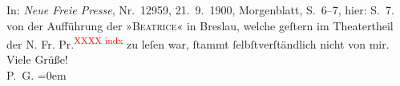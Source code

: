 \begin{ledgroupsized}[t]{13cm}
{{{                     In: \emph{Neue Freie Presse}, Nr. 12959, 21. 9. 1900, Morgenblatt, S. 6–7, hier:
                  S. 7.}}}\label{K_L02933-2h} von der Aufführung der »\textsc{Beatrice}« in Breslau, welche geſtern im Theatertheil der N. Fr.
                  Pr.\textcolor{red}{\textsuperscript{XXXX indx}} zu leſen war, ſtammt ſelbſtverſtändlich nicht von mir.\pend
           \pstart
           Viele Grüße! {\\[\baselineskip]}\spacefill\mbox{P. G.}\pend
           \leftskip=0em{}
         
         \endnumbering{}\end{ledgroupsized}\begin{anhang}\end{anhang}\newcommand{\dateiname}{L02933}\newcommand{\titel}{Paul Goldmann an Arthur Schnitzler, 22. 9. 1900}\newcommand{\editorInnen}{Martin Anton Müller und Laura Untner}
      